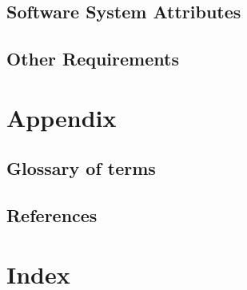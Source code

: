 \documentclass[a4paper,12pt]{article}
\begin{document}
\subsection{Software System Attributes}

\subsection{Other Requirements}

\section{Appendix}
\subsection{Glossary of terms}
\subsection{References}
\section{Index}
\end{document}
